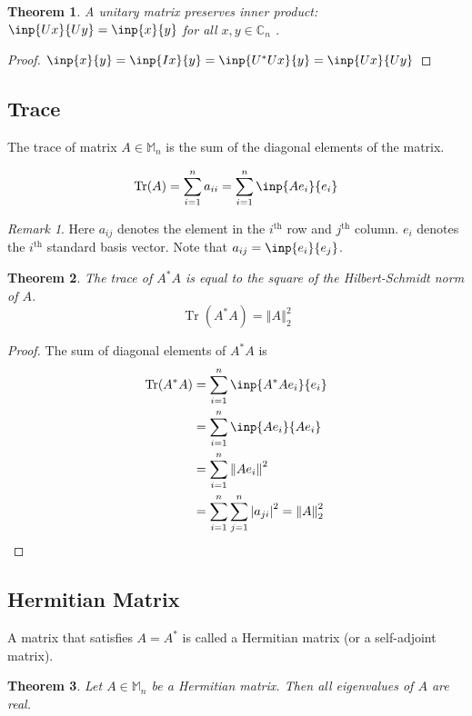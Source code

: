 \documentclass[twoside]{article}
\newcommand*\adj[1]{#1^*}
\newcommand*\norm[1]{\left \Vert #1 \right\Vert}
\newcommand*\abs[1]{\left \vert #1 \right\vert}
\DeclareMathOperator{\Tr}{Tr}
\theoremstyle{plain}
\newtheorem{theorem}{Theorem}
\theoremstyle{definition}
\theoremstyle{remark}
\newtheorem*{remark}{Remark}
\begin{document}
\begin{theorem} A unitary matrix preserves inner product: \(\inp{Ux}{Uy} = \inp{x}{y}\) for all  \(x, y \in \mathbb{C}_n\) . \end{theorem}

\begin{proof} \(\inp{x}{y} = \inp{Ix}{y} = \inp{\adj{U}U x}{y} = \inp{Ux}{Uy}\) \end{proof}

\subsection{Trace}
The trace of matrix \(A \in \mathbb{M}_n\) is the sum of the diagonal elements of the matrix.

\[\Tr(A) = \sum_{i=1} ^n a_{ii} = \sum_{i=1} ^n \inp{Ae_i}{ e_i}\]

\begin{remark}Here \(a_{ij}\) denotes the element in the \(i^{\text{th}}\) row and \(j^{\text{th}}\) column. \(e_i\) denotes the \(i^{\text{th}}\) standard basis vector. Note that \(a_{ij} = \inp{e_i}{e_j}\).\end{remark}

\begin{theorem}The trace of \(\adj{A}A\) is equal to the square of the Hilbert-Schmidt norm of \(A\). \[\Tr( \adj{A} A ) = \norm{A}_2^2\]\end{theorem}
\begin{proof}
The sum of diagonal elements of \(\adj{A} A\) is
 \begin{equation*} \begin{split} 
\Tr(\adj{A} A) & = \sum_{i=1}^n \inp{\adj{A}A e_i}{e_i} \\
 & = \sum_{i=1} ^n \inp{Ae_i}{Ae_i} \\
& = \sum_{i=1} ^n \norm{Ae_i}^2 \\
& = \sum_{i=1} ^n \sum_{j=1} ^n \abs{a_{ji}}^2  = \norm{A}^2_2
\end{split} \end{equation*}
 \end{proof}

\subsection{Hermitian Matrix}
A matrix that satisfies \(A = \adj{A}\) is called a Hermitian matrix (or a self-adjoint matrix). 

\begin{theorem} \label{herm_eig_real} Let \(A \in \mathbb{M}_n\) be a Hermitian matrix. Then all eigenvalues of \(A\) are real. \end{theorem}
\end{document}
